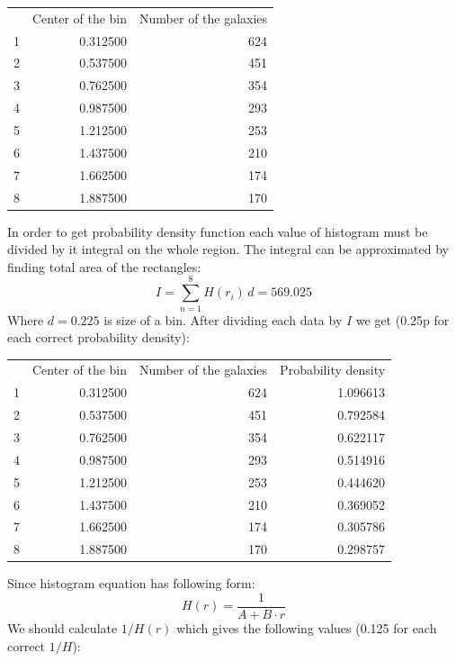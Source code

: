 \begin{description}
  \begin{center}
  \begin{tabular}{rrr}
  & Center of the bin & Number of the galaxies\\
  1 & 0.312500 & 624\\
  2 & 0.537500 & 451\\
  3 & 0.762500 & 354\\
  4 & 0.987500 & 293\\
  5 & 1.212500 & 253\\
  6 & 1.437500 & 210\\
  7 & 1.662500 & 174\\
  8 & 1.887500 & 170
  \end{tabular}
  \end{center}

  In order to get probability density function each value of histogram
  must be divided by it integral on the whole region. The integral can
  be approximated by finding total area of the rectangles:
  \[ I = \sum_{n=1}^{8}H(r_i)\,d = 569.025 \]
  Where $d = 0.225$ is size of a bin. After dividing each data by $I$ we
  get (0.25p for each correct probability density):

  \begin{center}
  \begin{tabular}{rrrr}
  & Center of the bin & Number of the galaxies & Probability density\\
  1 & 0.312500 & 624 & 1.096613\\
  2 & 0.537500 & 451 & 0.792584\\
  3 & 0.762500 & 354 & 0.622117\\
  4 & 0.987500 & 293 & 0.514916\\
  5 & 1.212500 & 253 & 0.444620\\
  6 & 1.437500 & 210 & 0.369052\\
  7 & 1.662500 & 174 & 0.305786\\
  8 & 1.887500 & 170 & 0.298757
  \end{tabular}
  \end{center}

\item[(f)] Since histogram equation has following form:
  \[ H(r) = \frac{1}{A + B\cdot r} \]
  We should calculate $1/H(r)$ which gives the following values (0.125
  for each correct $1/H$):


\end{description}
